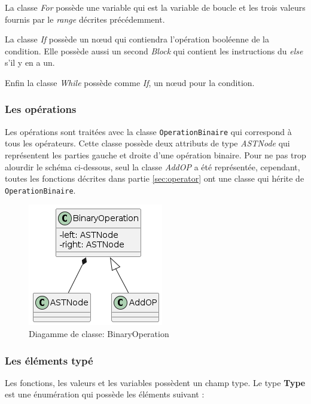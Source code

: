 \documentclass[a4paper]{article}%
\begin{document}
La classe \textit{For} possède une variable qui est la variable de boucle et les
trois valeurs fournis par le \textit{range} décrites précédemment.

La classe \textit{If} possède un nœud qui contiendra l'opération booléenne de la
condition. Elle possède aussi un second \textit{Block} qui contient les
instructions du \textit{else} s'il y en a un.

Enfin la classe \textit{While} possède comme \textit{If}, un nœud pour la
condition.

\subsubsection*{Les opérations}

Les opérations sont traitées avec la classe \lstinline{OperationBinaire} qui
correspond à tous les opérateurs. Cette classe possède deux attributs de type
\textit{ASTNode} qui représentent les parties gauche et droite d'une opération
binaire. Pour ne pas trop alourdir le schéma ci-dessous, seul la classe
\textit{AddOP} a été représentée, cependant, toutes les fonctions décrites dans
partie \ref{sec:operator} ont une classe qui hérite de
\lstinline{OperationBinaire}.
\clearpage

\begin{figure}[h!]
  \begin{center}
  \includegraphics[scale=0.5]{../ressources/diagrams/binaryOp.png}
  \caption{Diagamme de classe: BinaryOperation}
  \end{center}
\end{figure}

\subsubsection*{Les éléments typé}
\label{sec:eltTypes}

Les fonctions, les valeurs et les variables possèdent un champ type. Le type
\textbf{Type} est une énumération qui possède les éléments suivant :
\end{document}

